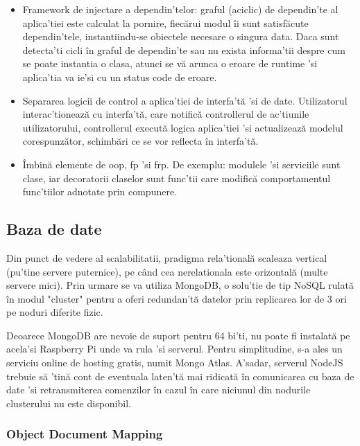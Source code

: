 \begin{itemize}
  \item Framework de injectare a dependin'telor: graful (aciclic) de dependin'te al aplica'tiei este calculat la pornire, fiecărui modul îi sunt satisfăcute dependin'tele, instantiindu-se obiectele necesare o singura data. Daca sunt detecta'ti cicli în graful de dependin'te sau nu exista informa'tii despre cum se poate instantia o clasa, atunci se vă arunca o eroare de runtime 'si aplica'tia va ie'si cu un status code de eroare. 
  \item Separarea logicii de control a aplica'tiei de interfa'tă 'si de date. Utilizatorul interac'tionează cu interfa'tă, care notifică controllerul de ac'tiunile utilizatorului, controllerul execută logica aplica'tiei 'si actualizează modelul corespunzător, schimbări ce se vor reflecta în interfa'tă.
  \item Îmbină elemente de \acrfull{oop}, \acrfull{fp} 'si \acrfull{frp}. De exemplu: modulele 'si serviciile sunt clase, iar decoratorii claselor sunt func'tii care modifică comportamentul func'tiilor adnotate prin compunere.

\end{itemize}

\subsection {Baza de date}

Din punct de vedere al scalabilitatii, pradigma rela'tională scaleaza vertical (pu'tine servere puternice), pe când cea nerelationala este orizontală (multe servere mici). Prin urmare se va utiliza MongoDB, o solu'tie de tip NoSQL rulată în modul "cluster" pentru a oferi redundan'tă datelor prin replicarea lor de 3 ori pe noduri diferite fizic.

Deoarece MongoDB are nevoie de suport pentru 64 bi'ti, nu poate fi instalată pe acela'si Raspberry Pi unde va rula 'si serverul. Pentru simplitudine, s-a ales un serviciu online de hosting gratis, numit Mongo Atlas. A'sadar, serverul NodeJS trebuie să 'tină cont de eventuala laten'tă mai ridicată în comunicarea cu baza de date 'si retransmiterea comenzilor în cazul în care niciunul din nodurile clusterului nu este disponibil.

\subsubsection {Object Document Mapping}

